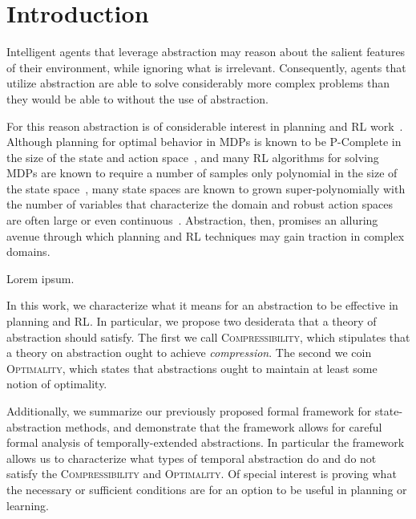 \section{Introduction}
\label{sec:intro}

Intelligent agents that leverage abstraction may reason about the salient features of their environment, while ignoring what is irrelevant. Consequently, agents that utilize abstraction are able to solve considerably more complex problems than they would be able to without the use of abstraction. 

For this reason abstraction is of considerable interest in planning and \ac{RL} work~. Although planning for optimal behavior in \acp{MDP} is known to be P-Complete in the size of the state and action space~\cite{papadimitriou1987complexity,littman1995complexity}, and many \ac{RL} algorithms for solving \acp{MDP} are known to require a number of samples only polynomial in the size of the state space~\cite{strehl2009reinforcement}, many state spaces are known to grown super-polynomially with the number of variables that characterize the domain \cite{abel2015goal} and robust action spaces are often large or even continuous~\cite{antos2008fitted,konidaris2014constructing}. Abstraction, then, promises an alluring avenue through which planning and \ac{RL} techniques may gain traction in complex domains. 

Lorem ipsum.

In this work, we characterize what it means for an abstraction to be effective in planning and \ac{RL}. In particular, we propose  two desiderata that a theory of abstraction should satisfy. The first we call \textsc{Compressibility}, which stipulates that a theory on abstraction ought to achieve {\it compression}. The second we coin \textsc{Optimality}, which states that abstractions ought to maintain at least some notion of optimality.

Additionally, we summarize our previously proposed formal framework for state-abstraction methods, and demonstrate that the framework allows for careful formal analysis of temporally-extended abstractions. In particular the framework allows us to characterize what types of temporal abstraction do and do not satisfy the \textsc{Compressibility} and \textsc{Optimality}. Of special interest is proving what the necessary or sufficient conditions are for an option to be useful in planning or learning. 